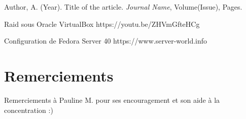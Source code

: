 \documentclass{article}
\begin{document}
	\begin{thebibliography}{9}
		Author, A. (Year). Title of the article. \textit{Journal Name}, Volume(Issue), Pages.
		
		Raid sous Oracle VirtualBox 
		https://youtu.be/ZHVmGfteHCg
		
		Configuration de Fedora Server 40
		https://www.server-world.info
		
	\end{thebibliography}

	\section*{Remerciements}
	
	Remerciements à Pauline M. pour ses encouragement et son aide à la concentration :)
\end{document}

